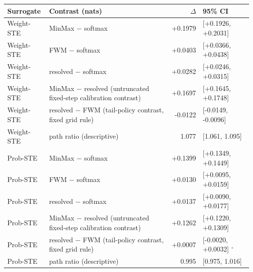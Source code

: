\begin{tabular}{llrl}
\toprule
Surrogate & Contrast (nats) & $\Delta$ & 95\% CI \\
\midrule
Weight-STE & MinMax $-$ softmax & +0.1979 & [+0.1926, +0.2031] \\
Weight-STE & FWM $-$ softmax & +0.0403 & [+0.0366, +0.0438] \\
Weight-STE & resolved $-$ softmax & +0.0282 & [+0.0246, +0.0315] \\
Weight-STE & MinMax $-$ resolved (untruncated fixed-step calibration contrast) & +0.1697 & [+0.1645, +0.1748] \\
Weight-STE & resolved $-$ FWM (tail-policy contrast, fixed grid rule) & -0.0122 & [-0.0149, -0.0096] \\
Weight-STE & path ratio (descriptive) & 1.077 & [1.061, 1.095] \\ \midrule
Prob-STE & MinMax $-$ softmax & +0.1399 & [+0.1349, +0.1449] \\
Prob-STE & FWM $-$ softmax & +0.0130 & [+0.0095, +0.0159] \\
Prob-STE & resolved $-$ softmax & +0.0137 & [+0.0090, +0.0177] \\
Prob-STE & MinMax $-$ resolved (untruncated fixed-step calibration contrast) & +0.1262 & [+0.1220, +0.1309] \\
Prob-STE & resolved $-$ FWM (tail-policy contrast, fixed grid rule) & +0.0007 & [-0.0020, +0.0032] $^{\circ}$ \\
Prob-STE & path ratio (descriptive) & 0.995 & [0.975, 1.016] \\
\bottomrule
\end{tabular}
